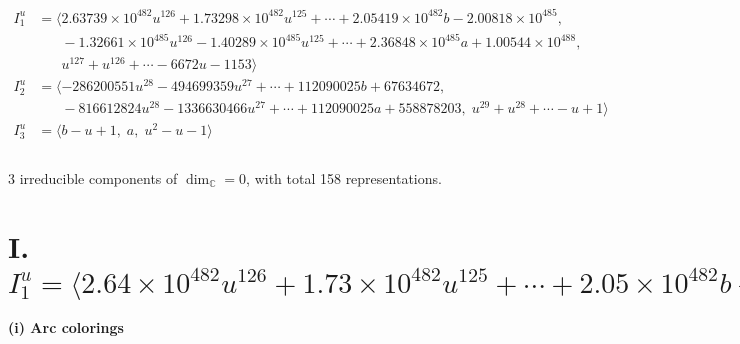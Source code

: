 \documentclass[1p]{elsarticle_modified}
\theoremstyle{definition}
\begin{document}
\begin{align*}
I^u_{1}&=\langle 
2.63739\times10^{482} u^{126}+1.73298\times10^{482} u^{125}+\cdots+2.05419\times10^{482} b-2.00818\times10^{485},\\
\phantom{I^u_{1}}&\phantom{= \langle  }-1.32661\times10^{485} u^{126}-1.40289\times10^{485} u^{125}+\cdots+2.36848\times10^{485} a+1.00544\times10^{488},\\
\phantom{I^u_{1}}&\phantom{= \langle  }u^{127}+u^{126}+\cdots-6672 u-1153\rangle \\
I^u_{2}&=\langle 
-286200551 u^{28}-494699359 u^{27}+\cdots+112090025 b+67634672,\\
\phantom{I^u_{2}}&\phantom{= \langle  }-816612824 u^{28}-1336630466 u^{27}+\cdots+112090025 a+558878203,\;u^{29}+u^{28}+\cdots- u+1\rangle \\
I^u_{3}&=\langle 
b- u+1,\;a,\;u^2- u-1\rangle \\
\\
\end{align*}
\raggedright * 3 irreducible components of $\dim_{\mathbb{C}}=0$, with total 158 representations.\\
\newpage
\renewcommand{\arraystretch}{1}
\centering \section*{I. $I^u_{1}= \langle 2.64\times10^{482} u^{126}+1.73\times10^{482} u^{125}+\cdots+2.05\times10^{482} b-2.01\times10^{485},\;-1.33\times10^{485} u^{126}-1.40\times10^{485} u^{125}+\cdots+2.37\times10^{485} a+1.01\times10^{488},\;u^{127}+u^{126}+\cdots-6672 u-1153 \rangle$}
\flushleft \textbf{(i) Arc colorings}\\
\end{document}

